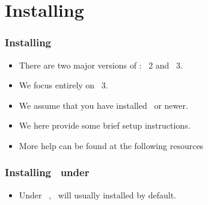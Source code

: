\documentclass[aspectratio=169,mathserif,notheorems]{beamer}%
\begin{document}
\section{Installing \python}%
%
\begin{frame}%
\frametitle{Installing \python}%
\begin{itemize}%
\item There are two major versions of \python: \python~2 and \python~3.%
\item<2-> \alert{We focus entirely on \python~3.}%
\item<3-> We assume that you have installed \pythonWithVersion\ or newer.
\item<4-> We here provide some brief setup instructions.
\item<5->More help can be found at the following resources%
\end{itemize}%
\end{frame}%
%
\begin{frame}[fragile,t]
\frametitle{Installing \python\ under \ubuntu\ \linux}%
\begin{itemize}%
\item Under \ubuntu\ \linux, \python\ will usually installed by default.%
\end{itemize}%
%
%
\end{frame}
%
\end{document}
